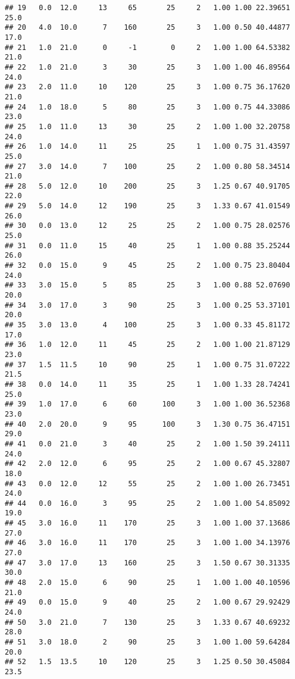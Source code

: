 \documentclass[
]{article}
\begin{document}
\begin{verbatim}
## 19   0.0  12.0     13     65       25     2   1.00 1.00 22.39651      25.0
## 20   4.0  10.0      7    160       25     3   1.00 0.50 40.44877      17.0
## 21   1.0  21.0      0     -1        0     2   1.00 1.00 64.53382      21.0
## 22   1.0  21.0      3     30       25     3   1.00 1.00 46.89564      24.0
## 23   2.0  11.0     10    120       25     3   1.00 0.75 36.17620      21.0
## 24   1.0  18.0      5     80       25     3   1.00 0.75 44.33086      23.0
## 25   1.0  11.0     13     30       25     2   1.00 1.00 32.20758      24.0
## 26   1.0  14.0     11     25       25     1   1.00 0.75 31.43597      25.0
## 27   3.0  14.0      7    100       25     2   1.00 0.80 58.34514      21.0
## 28   5.0  12.0     10    200       25     3   1.25 0.67 40.91705      22.0
## 29   5.0  14.0     12    190       25     3   1.33 0.67 41.01549      26.0
## 30   0.0  13.0     12     25       25     2   1.00 0.75 28.02576      25.0
## 31   0.0  11.0     15     40       25     1   1.00 0.88 35.25244      26.0
## 32   0.0  15.0      9     45       25     2   1.00 0.75 23.80404      24.0
## 33   3.0  15.0      5     85       25     3   1.00 0.88 52.07690      20.0
## 34   3.0  17.0      3     90       25     3   1.00 0.25 53.37101      20.0
## 35   3.0  13.0      4    100       25     3   1.00 0.33 45.81172      17.0
## 36   1.0  12.0     11     45       25     2   1.00 1.00 21.87129      23.0
## 37   1.5  11.5     10     90       25     1   1.00 0.75 31.07222      21.5
## 38   0.0  14.0     11     35       25     1   1.00 1.33 28.74241      25.0
## 39   1.0  17.0      6     60      100     3   1.00 1.00 36.52368      23.0
## 40   2.0  20.0      9     95      100     3   1.30 0.75 36.47151      29.0
## 41   0.0  21.0      3     40       25     2   1.00 1.50 39.24111      24.0
## 42   2.0  12.0      6     95       25     2   1.00 0.67 45.32807      18.0
## 43   0.0  12.0     12     55       25     2   1.00 1.00 26.73451      24.0
## 44   0.0  16.0      3     95       25     2   1.00 1.00 54.85092      19.0
## 45   3.0  16.0     11    170       25     3   1.00 1.00 37.13686      27.0
## 46   3.0  16.0     11    170       25     3   1.00 1.00 34.13976      27.0
## 47   3.0  17.0     13    160       25     3   1.50 0.67 30.31335      30.0
## 48   2.0  15.0      6     90       25     1   1.00 1.00 40.10596      21.0
## 49   0.0  15.0      9     40       25     2   1.00 0.67 29.92429      24.0
## 50   3.0  21.0      7    130       25     3   1.33 0.67 40.69232      28.0
## 51   3.0  18.0      2     90       25     3   1.00 1.00 59.64284      20.0
## 52   1.5  13.5     10    120       25     3   1.25 0.50 30.45084      23.5

\end{verbatim}
\end{document}
